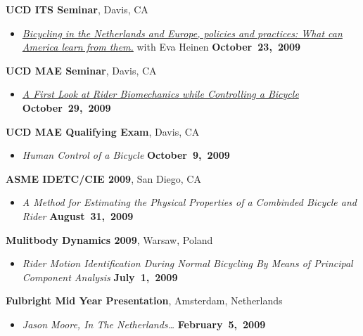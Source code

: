 \documentclass[10pt]{article}
\newenvironment{outerlist}[1][\enskip\textbullet]%
        {\begin{itemize}[#1]}{\end{itemize}%
         \vspace{-.6\baselineskip}}
\newcommand{\blankline}{\quad\pagebreak[2]}
\begin{document}
\blankline

\textbf{UCD ITS Seminar}, Davis, CA
\begin{outerlist}
\item[]
  \textit{\href{http://www.its.ucdavis.edu/?seminar=october-23-2009}{Bicycling
    in the Netherlands and Europe, policies and practices: What can America
    learn from them.}} with Eva Heinen
    \hfill \textbf{October~23,~2009}
\end{outerlist}

\blankline

\textbf{UCD MAE Seminar}, Davis, CA
\begin{outerlist}
  \item[]
    \textit{\href{http://archive.org/details/AFirstLookAtRiderBiomechanicsWhileControllingABicycle}{A
      First Look at Rider Biomechanics while Controlling a Bicycle}}
    \hfill \textbf{October~29,~2009}
\end{outerlist}

\blankline

\textbf{UCD MAE Qualifying Exam}, Davis, CA
\begin{outerlist}
  \item[] \textit{Human Control of a Bicycle}
    \hfill \textbf{October~9,~2009}
\end{outerlist}

\blankline

\textbf{ASME IDETC/CIE 2009}, San Diego, CA
\begin{outerlist}
  \item[] \textit{A Method for Estimating the Physical Properties of a Combinded Bicycle and
Rider}
    \hfill \textbf{August~31,~2009}
\end{outerlist}

\blankline

\textbf{Mulitbody Dynamics 2009}, Warsaw, Poland
\begin{outerlist}
  \item[] \textit{Rider Motion Identification During Normal Bicycling By Means of Principal
Component Analysis}
    \hfill \textbf{July~1,~2009}
\end{outerlist}

\blankline

\textbf{Fulbright Mid Year Presentation}, Amsterdam, Netherlands
\begin{outerlist}
  \item[] \textit{Jason Moore, In The Netherlands\ldots}
    \hfill \textbf{February~5,~2009}
\end{outerlist}
\end{document}
